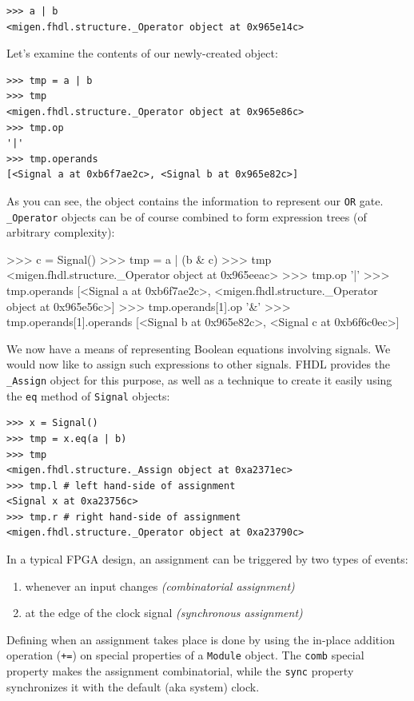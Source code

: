 \documentclass[11pt]{paper}
\begin{document}
\begin{verbatim}
>>> a | b
<migen.fhdl.structure._Operator object at 0x965e14c>
\end{verbatim}

Let's examine the contents of our newly-created object:
\begin{verbatim}
>>> tmp = a | b
>>> tmp
<migen.fhdl.structure._Operator object at 0x965e86c>
>>> tmp.op
'|'
>>> tmp.operands
[<Signal a at 0xb6f7ae2c>, <Signal b at 0x965e82c>]
\end{verbatim}

As you can see, the object contains the information to represent our \verb!OR! gate. \verb!_Operator! objects can be of course combined to form expression trees (of arbitrary complexity):
\begin{verbatimtab}
>>> c = Signal()
>>> tmp = a | (b & c)
>>> tmp
<migen.fhdl.structure._Operator object at 0x965eeac>
>>> tmp.op
'|'
>>> tmp.operands
[<Signal a at 0xb6f7ae2c>, 
  <migen.fhdl.structure._Operator object at 0x965e56c>]
>>> tmp.operands[1].op
'&'
>>> tmp.operands[1].operands
[<Signal b at 0x965e82c>, <Signal c at 0xb6f6c0ec>]
\end{verbatimtab}

We now have a means of representing Boolean equations involving signals. We would now like to assign such expressions to other signals. FHDL provides the \verb!_Assign! object for this purpose, as well as a technique to create it easily using the \verb!eq! method of \verb!Signal! objects:
\begin{verbatim}
>>> x = Signal()
>>> tmp = x.eq(a | b)
>>> tmp
<migen.fhdl.structure._Assign object at 0xa2371ec>
>>> tmp.l # left hand-side of assignment
<Signal x at 0xa23756c>
>>> tmp.r # right hand-side of assignment
<migen.fhdl.structure._Operator object at 0xa23790c>
\end{verbatim}

In a typical FPGA design, an assignment can be triggered by two types of events:
\begin{enumerate}
\item whenever an input changes \textit{(combinatorial assignment)}
\item at the edge of the clock signal \textit{(synchronous assignment)}
\end{enumerate}

Defining when an assignment takes place is done by using the in-place addition operation (\verb!+=!) on special properties of a \verb!Module! object. The \verb!comb! special property makes the assignment combinatorial, while the \verb!sync! property synchronizes it with the default (aka system) clock.
\end{document}
